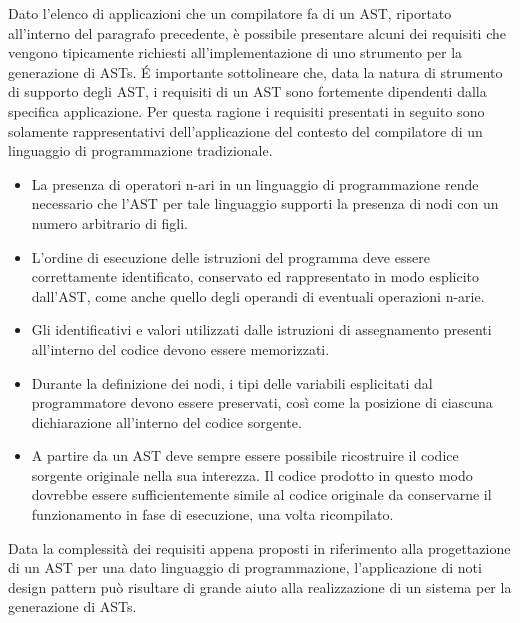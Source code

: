 Dato l’elenco di applicazioni che un compilatore fa di un AST, riportato
all’interno del paragrafo precedente, è possibile presentare alcuni dei
requisiti che vengono tipicamente richiesti all’implementazione di uno
strumento per la generazione di ASTs. É importante sottolineare che, data la
natura di strumento di supporto degli AST, i requisiti di un AST sono
fortemente dipendenti dalla specifica applicazione. Per questa ragione i
requisiti presentati in seguito sono solamente rappresentativi
dell’applicazione del contesto del compilatore di un linguaggio di
programmazione tradizionale.

\begin{itemize}

\item La presenza di operatori n-ari in un linguaggio di programmazione rende
necessario che l’AST per tale linguaggio supporti la presenza di nodi con un
numero arbitrario di figli.

\item L’ordine di esecuzione delle istruzioni del programma deve essere
correttamente identificato, conservato ed rappresentato in modo esplicito
dall’AST, come anche quello degli operandi di eventuali operazioni n-arie.

\item Gli identificativi e valori utilizzati dalle istruzioni di assegnamento
presenti all’interno del codice devono essere memorizzati.

\item Durante la definizione dei nodi, i tipi delle variabili esplicitati dal
programmatore devono essere preservati, così come la posizione di ciascuna
dichiarazione all’interno del codice sorgente.

\item A partire da un AST deve sempre essere possibile ricostruire il codice
sorgente originale nella sua interezza. Il codice prodotto in questo modo
dovrebbe essere sufficientemente simile al codice originale da conservarne il
funzionamento in fase di esecuzione, una volta ricompilato.\\

\end{itemize}

Data la complessità dei requisiti appena proposti in riferimento alla
progettazione di un AST per una dato linguaggio di programmazione,
l’applicazione di noti design pattern può risultare di grande aiuto alla
realizzazione di un sistema per la generazione di ASTs.

